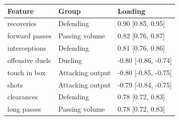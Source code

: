 
\begin{tabular}{lll}
\toprule
Feature & Group & Loading\\
\midrule
recoveries & Defending & 0.90 [0.85, 0.95]\\
forward passes & Passing volume & 0.82 [0.76, 0.87]\\
interceptions & Defending & 0.81 [0.76, 0.86]\\
offensive duels & Dueling & -0.80 [-0.86, -0.74]\\
touch in box & Attacking output & -0.80 [-0.85, -0.75]\\
shots & Attacking output & -0.79 [-0.84, -0.75]\\
clearances & Defending & 0.78 [0.72, 0.83]\\
long passes & Passing volume & 0.78 [0.72, 0.83]\\
\bottomrule
\end{tabular}

